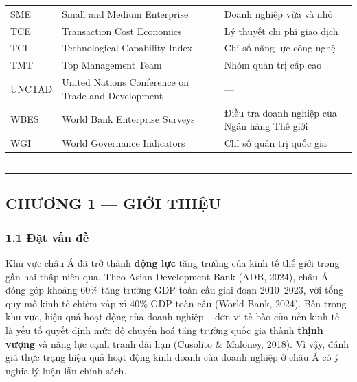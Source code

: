 \documentclass[12pt,a4paper]{article}
\begin{document}
\begin{longtable}[]{@{}lll@{}}
SME & Small and Medium Enterprise & Doanh nghiệp vừa và nhỏ \\
TCE & Transaction Cost Economics & Lý thuyết chi phí giao dịch \\
TCI & Technological Capability Index & Chỉ số năng lực công nghệ \\
TMT & Top Management Team & Nhóm quản trị cấp cao \\
UNCTAD & United Nations Conference on Trade and Development & --- \\
WBES & World Bank Enterprise Surveys & Điều tra doanh nghiệp của Ngân
hàng Thế giới \\
WGI & World Governance Indicators & Chỉ số quản trị quốc gia \\
\end{longtable}

\begin{center}\rule{0.5\linewidth}{0.5pt}\end{center}

\begin{center}\rule{0.5\linewidth}{0.5pt}\end{center}

\hypertarget{chux1b0ux1a1ng-1--giux1edbi-thiux1ec7u}{%
\subsection{CHƯƠNG 1 --- GIỚI
THIỆU}\label{chux1b0ux1a1ng-1--giux1edbi-thiux1ec7u}}

\hypertarget{11-ux111ux1eb7t-vux1ea5n-ux111ux1ec1}{%
\subsubsection{1.1 Đặt vấn
đề}\label{11-ux111ux1eb7t-vux1ea5n-ux111ux1ec1}}

Khu vực châu Á đã trở thành \textbf{động lực} tăng trưởng của kinh tế
thế giới trong gần hai thập niên qua. Theo Asian Development Bank (ADB,
2024), châu Á đóng góp khoảng 60\% tăng trưởng GDP toàn cầu giai đoạn
2010--2023, với tổng quy mô kinh tế chiếm xấp xỉ 40\% GDP toàn cầu
(World Bank, 2024). Bên trong khu vực, hiệu quả hoạt động của doanh
nghiệp -- đơn vị tế bào của nền kinh tế -- là yếu tố quyết định mức độ
chuyển hoá tăng trưởng quốc gia thành \textbf{thịnh vượng} và năng lực
cạnh tranh dài hạn (Cusolito \& Maloney, 2018). Vì vậy, đánh giá thực
trạng hiệu quả hoạt động kinh doanh của doanh nghiệp ở châu Á có ý nghĩa
lý luận lẫn chính sách.
\end{document}
